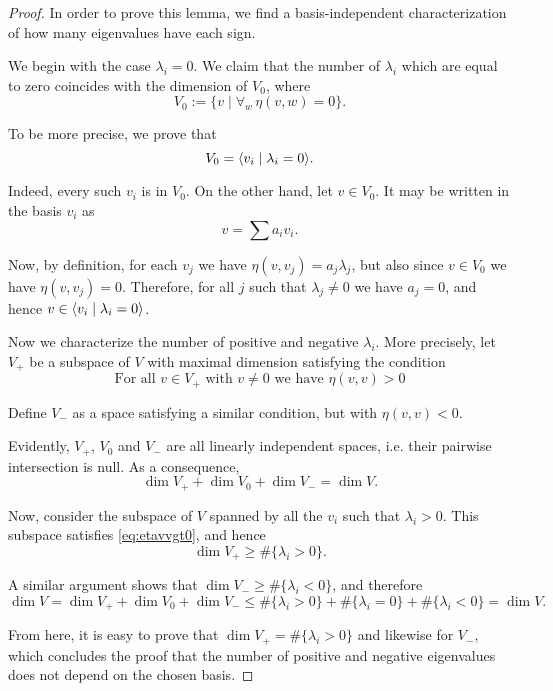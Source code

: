 \begin{proof}
In order to prove this lemma, we find a basis-independent characterization of how many eigenvalues have each sign.

We begin with the case $\lambda_i = 0$. We claim that the number of $\lambda_i$ which are equal to zero coincides with the dimension of $V_0$, where
\begin{equation}
V_0 := \{v \mid \forall_w\, \eta(v,w) = 0\}.
\end{equation}

To be more precise, we prove that
\begin{equation}
V_0 =  \langle v_i \mid \lambda_i = 0\rangle.
\end{equation}

Indeed, every such $v_i$ is in $V_0$. On the other hand, let $v \in V_0$. It may be written in the basis $v_i$ as
\begin{equation}
v = \sum a_i v_i.
\end{equation}

Now, by definition, for each $v_j$ we have $\eta(v,v_j) = a_j \lambda_j$, but also since $v \in V_0$ we have $\eta(v,v_j) = 0$. Therefore, for all $j$ such that $\lambda_j \neq 0$ we have $a_j = 0$, and hence $v \in \langle v_i \mid \lambda_i = 0\rangle$.

\smallskip

Now we characterize the number of positive and negative $\lambda_i$. More precisely, let $V_+$ be a subspace of $V$ with maximal dimension satisfying the condition
\begin{equation}\label{eq:etavvgt0}
\text{For all $v \in V_+$ with $v \neq 0$ we have $\eta(v,v) > 0$}
\end{equation}

Define $V_-$ as a space satisfying a similar condition, but with $\eta(v,v) < 0$.

Evidently, $V_+$, $V_0$ and $V_-$ are all linearly independent spaces, i.e. their pairwise intersection is null. As a consequence,
\begin{equation}
\dim V_+ + \dim V_0 + \dim V_- = \dim V.
\end{equation}

Now, consider the subspace of $V$ spanned by all the $v_i$ such that $\lambda_i > 0$. This subspace satisfies \eqref{eq:etavvgt0}, and hence
\begin{equation}
\dim V_+ \geq \#\{\lambda_i > 0\}.
\end{equation}

A similar argument shows that $\dim V_- \geq \#\{\lambda_i < 0\}$, and therefore
\begin{equation}
\dim V = \dim V_+ + \dim V_0 + \dim V_- \leq \#\{\lambda_i > 0\} + \#\{\lambda_i = 0\} + \#\{\lambda_i < 0\} = \dim V.
\end{equation}

From here, it is easy to prove that $\dim V_+ = \#\{\lambda_i > 0\}$ and likewise for $V_-$, which concludes the proof that the number of positive and negative eigenvalues does not depend on the chosen basis.
\end{proof}

